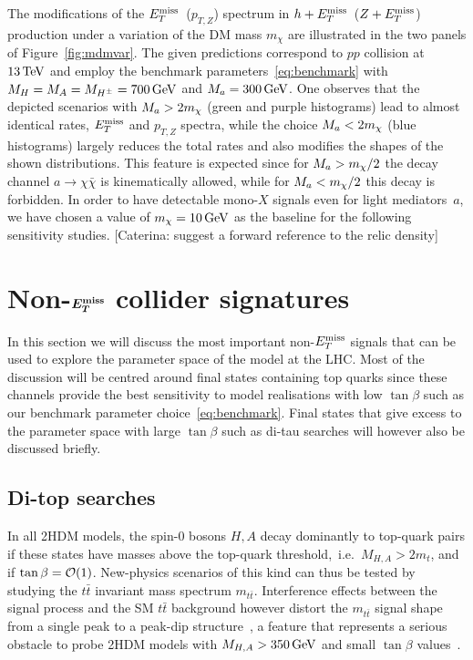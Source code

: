 The modifications of the $E_T^\mathrm{miss}$~($p_{T,Z}$) spectrum in $h+E_T^\mathrm{miss}$~($Z+E_T^\mathrm{miss}$) production under a variation of the DM mass $m_\chi$ are illustrated in the two panels of Figure~\ref{fig:mdmvar}. The given predictions correspond to $pp$ collision at $13 \, {\rm TeV}$ and employ the benchmark parameters~\eqref{eq:benchmark} with $M_{H} = M_{A} = M_{H^{\pm}} = 700 \, {\rm GeV}$ and $M_{a} = 300 \, {\rm GeV}$. One observes that the depicted scenarios with $M_{a}  > 2 m_\chi$ (green and purple histograms) lead to almost identical rates, $E_T^\mathrm{miss}$ and $p_{T,Z}$ spectra, while the choice $M_{a}  < 2 m_\chi$ (blue histograms) 
largely reduces the total rates and also modifies the shapes of the shown distributions. This feature is expected since for $M_{a} > m_\chi/2$ the decay channel $a \to \chi \bar \chi$ is kinematically allowed, while for $M_{a} < m_\chi/2$ this decay is forbidden. In order to have detectable mono-$X$ signals even for light mediators~$a$, we have chosen a value of  $m_\chi = 10 \, {\rm GeV}$ as the baseline for the following sensitivity studies. {\color{red} [Caterina: suggest a forward reference to the relic density]}

\section{Non-$\mbox{\boldmath$E_T^{\rm miss}$\unboldmath}$ collider signatures}
\label{sec:nonMET}

In this section we will discuss the most important non-$E_T^\mathrm{miss}$ signals that can be used to explore the parameter space of the \hdma model at the LHC. Most of the discussion will be centred around final states containing top quarks since these channels provide the best sensitivity to model realisations with low $\tan \beta$ such as our benchmark parameter choice~\eqref{eq:benchmark}. Final states that give excess to the \hdma parameter space with large $\tan \beta$ such as di-tau searches will however also be discussed briefly. 

\subsection{Di-top  searches}
\label{sec:ttbarresonances}

In all 2HDM models, the spin-0 bosons $H,A$  decay dominantly to top-quark pairs if these states have masses above the top-quark threshold,~i.e.~$M_{H, A} > 2 m_t$, and if $\tan \beta = {\cal O}(1)$. New-physics scenarios of this kind can thus be tested by studying the $t \bar t$ invariant mass spectrum $m_{t \bar t}$.  Interference effects between the signal process and the SM  $t \bar t$ background however distort the $m_{t \bar t}$ signal shape from a single peak to a peak-dip structure~\cite{Gaemers:1984sj,Dicus:1994bm,Bernreuther:1997gs,Frederix:2007gi,Hespel:2016qaf}, a feature that represents a serious obstacle to probe 2HDM models with $M_{H,A} > 350 \, {\rm GeV}$ and small $\tan \beta$ values~\cite{Craig:2015jba,Hajer:2015gka,Gori:2016zto,Carena:2016npr}. 


